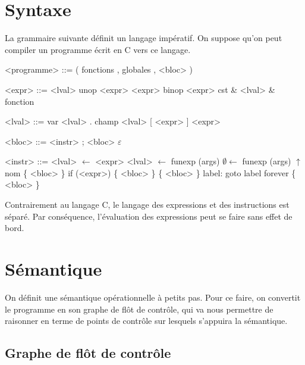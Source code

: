 \documentclass{article}
\begin{document}
\section{Syntaxe}

La grammaire suivante définit un langage impératif. On suppose qu'on peut
compiler un programme écrit en C vers ce langage.

\begin{grammar}
<programme> ::= ( fonctions , globales , <bloc> )
\end{grammar}
\begin{minipage}{0.4\textwidth}
\begin{grammar}
    <expr> ::= <lval>
          \alt unop <expr>
          \alt <expr> binop <expr>
          \alt cst
          \alt \& <lval>
          \alt \& fonction

    <lval> ::= var
          \alt <lval> . champ
          \alt <lval> [ <expr> ]
          \alt * <expr>
\end{grammar}
\end{minipage}
\begin{minipage}{0.4\textwidth}
\begin{grammar}
     <bloc> ::= <instr> ; <bloc>
           \alt $ε$

    <instr> ::= <lval> $←$ <expr>
           \alt <lval> $←$ funexp (args)
           \alt  $∅ ←$ funexp (args)
           \alt $↑$ nom \{ <bloc> \}
           \alt if (<expr>) \{ <bloc> \}
           \alt \{ <bloc> \} label:
           \alt goto label
           \alt forever \{ <bloc> \}

\end{grammar}
\end{minipage}

Contrairement au langage C, le langage des expressions et des instructions est
séparé. Par conséquence, l'évaluation des expressions peut se faire sans effet de
bord.

\section{Sémantique}

On définit une sémantique opérationnelle à petits pas. Pour ce faire, on
convertit le programme en son graphe de flôt de contrôle, qui va nous permettre
de raisonner en terme de points de contrôle sur lesquels s'appuira la
sémantique.

\subsection{Graphe de flôt de contrôle}
\end{document}
